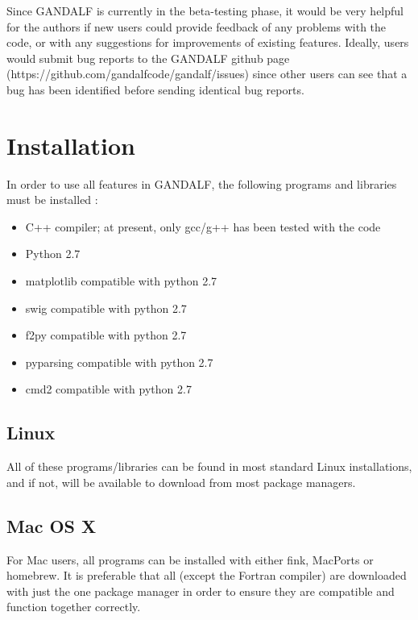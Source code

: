 \documentclass[a4paper]{article}
\begin{document}
Since GANDALF is currently in the beta-testing phase, it would be very helpful for the authors if new users could provide feedback of any problems with the code, or with any suggestions for improvements of existing features.  Ideally, users would submit bug reports to the GANDALF github page (https://github.com/gandalfcode/gandalf/issues) since other users can see that a bug has been identified before sending identical bug reports.

\newpage


\section{Installation} \label{S:INSTALL}
In order to use all features in GANDALF, the following programs and libraries must be installed : 
\begin{itemize}
\item C++ compiler; at present, only gcc/g++ has been tested with the code
\item Python 2.7
\item matplotlib compatible with python 2.7
\item swig compatible with python 2.7
\item f2py compatible with python 2.7
\item pyparsing compatible with python 2.7
\item cmd2 compatible with python 2.7
\end{itemize}


\subsection{Linux}
All of these programs/libraries can be found in most standard Linux installations, and if not, will be available to download from most package managers.  

\subsection{Mac OS X} 
For Mac users, all programs can be installed with either fink, MacPorts or homebrew.  It is preferable that all (except the Fortran compiler) are downloaded with just the one package manager in order to ensure they are compatible and function together correctly.
\end{document}
